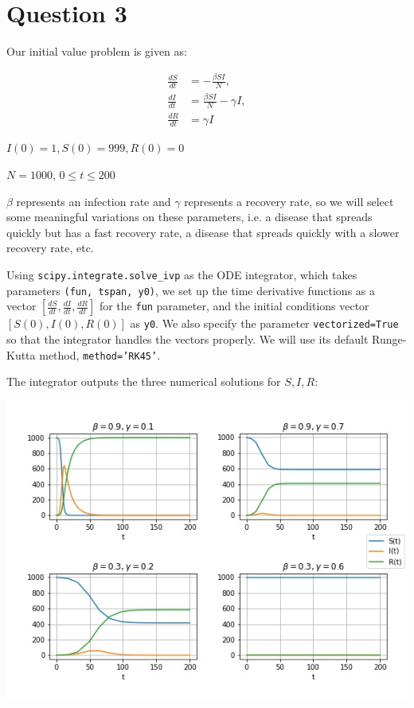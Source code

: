 \documentclass{article}
\begin{document}
\section*{Question 3}

Our initial value problem is given as:

\begin{align}
    \frac{dS}{dt} &= -\frac{\beta S I}{N},\\
    \frac{dI}{dt} &= \frac{\beta S I}{N} - \gamma I,\\
    \frac{dR}{dt} &= \gamma I
\end{align}

$I(0) = 1, S(0)=999, R(0) = 0$

$N=1000$, $0\leq t \leq 200$

$\beta$ represents an infection rate and $\gamma$ represents a recovery rate, so we will select some meaningful variations on these parameters, i.e. a disease that spreads quickly but has a fast recovery rate, a disease that spreads quickly with a slower recovery rate, etc.

Using \texttt{scipy.integrate.solve\_ivp} as the ODE integrator, which takes parameters \texttt{(fun, tspan, y0)}, we set up the time derivative functions as a vector $[\frac{dS}{dt},\frac{dI}{dt},\frac{dR}{dt}]$ for the \texttt{fun} parameter, and the initial conditions vector $[S(0), I(0), R(0)]$ as \texttt{y0}. We also specify the parameter \texttt{vectorized=True} so that the integrator handles the vectors properly. We will use its default Runge-Kutta method, \texttt{method='RK45'}.
	
The integrator outputs the three numerical solutions for $S, I, R$:

\includegraphics[scale=0.75]{plot3}
\end{document}

